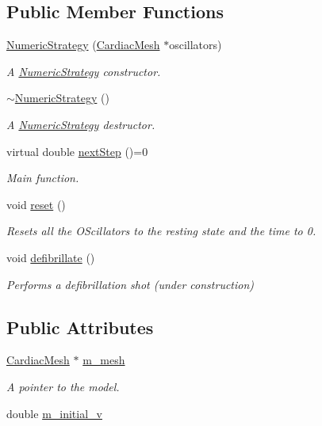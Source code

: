 \subsection*{Public Member Functions}
\begin{DoxyCompactItemize}
\item 
\hyperlink{class_numeric_strategy_a8f4a5e5be06427098e3a9b3635658786}{Numeric\+Strategy} (\hyperlink{class_cardiac_mesh}{Cardiac\+Mesh} $\ast$oscillators)
\begin{DoxyCompactList}\small\item\em A \hyperlink{class_numeric_strategy}{Numeric\+Strategy} constructor. \end{DoxyCompactList}\item 
\hyperlink{class_numeric_strategy_ac167251a4c6409131a1be21ce3104870}{$\sim$\+Numeric\+Strategy} ()
\begin{DoxyCompactList}\small\item\em A \hyperlink{class_numeric_strategy}{Numeric\+Strategy} destructor. \end{DoxyCompactList}\item 
virtual double \hyperlink{class_numeric_strategy_aeab387274e9d0ebf46a0e5ad5a5fe73f}{next\+Step} ()=0
\begin{DoxyCompactList}\small\item\em Main function. \end{DoxyCompactList}\item 
void \hyperlink{class_numeric_strategy_af85e11ad875a008cd1b6d8b288e3866c}{reset} ()
\begin{DoxyCompactList}\small\item\em Resets all the O\+Scillators to the resting state and the time to 0. \end{DoxyCompactList}\item 
void \hyperlink{class_numeric_strategy_a0c081c97ced262ef0478daf66041ee05}{defibrillate} ()
\begin{DoxyCompactList}\small\item\em Performs a defibrillation shot (under construction) \end{DoxyCompactList}\end{DoxyCompactItemize}
\subsection*{Public Attributes}
\begin{DoxyCompactItemize}
\item 
\hyperlink{class_cardiac_mesh}{Cardiac\+Mesh} $\ast$ \hyperlink{class_numeric_strategy_a2ca52f550fd3f1cc26c65aec0cacf2f6}{m\+\_\+mesh}
\begin{DoxyCompactList}\small\item\em A pointer to the model. \end{DoxyCompactList}\item 
double \hyperlink{class_numeric_strategy_a4ee8b2dbaa436c241384f959cc5fe54d}{m\+\_\+initial\+\_\+v}
\end{DoxyCompactItemize}


